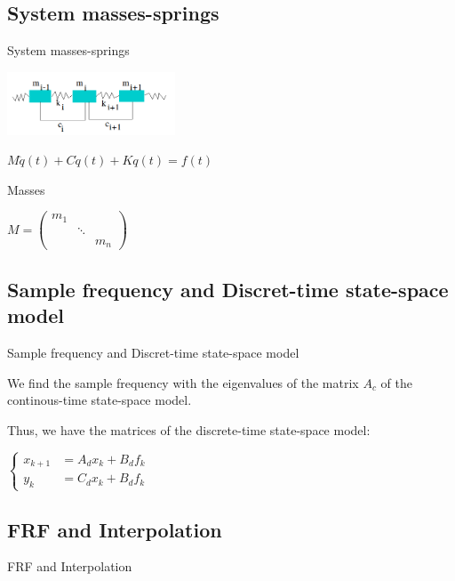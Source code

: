 \documentclass{beamer}
\begin{document}
\subsection{System masses-springs}
\begin{frame}{System masses-springs}
\begin{center}
\includegraphics[width=5cm]{images/ressorts.png}

$M \ddot{q}(t) + C \dot{q}(t) + K q(t) = f(t)$
\end{center}


\begin{exampleblock}{Masses}
\begin{center}
$
M = 
\begin{pmatrix} 
m_1\\ 
&\ddots\\ 
&&m_n
\end{pmatrix}
$
\end{center}
\end{exampleblock}

\end{frame}

\subsection{Sample frequency and Discret-time state-space model}
\begin{frame}{Sample frequency and Discret-time state-space model}

We find the sample frequency with the eigenvalues of the matrix $A_c$ of the continous-time state-space model.

\vspace{5mm}

Thus, we have the matrices of the discrete-time state-space model:
\begin{center}
$\left\{
\begin{array}{ll}
x_{k+1} & = A_dx_k + B_df_k \\
y_k & = C_dx_k + B_df_k
\end{array}
\right.$
\end{center}

\end{frame}

\subsection{FRF and Interpolation}
\begin{frame}{FRF and Interpolation}
\end{frame}
\end{document}
